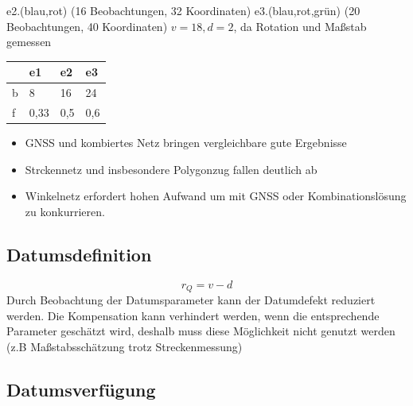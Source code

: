 \documentclass[12pt]{article}
\begin{document}
e2.(blau,rot) (16 Beobachtungen, 32 Koordinaten) \newline
e3.(blau,rot,grün) (20 Beobachtungen, 40 Koordinaten) \newline
$v=18, d=2$, da Rotation und Maßstab gemessen
\begin{table}[ht]\centering
	\begin{tabular}{|l|l|l|l|}
		\hline
	          &  e1     &   e2    & e3  \\ \hline
		b     & 8  & 16  & 24 \\ \hline
		f     & 0,33  & 0,5 & 0,6\\ \hline
	\end{tabular}
\end{table}
\begin{itemize}
\item GNSS und kombiertes Netz bringen vergleichbare gute Ergebnisse
\item Strckennetz und insbesondere Polygonzug fallen deutlich ab
\item Winkelnetz erfordert hohen Aufwand um mit GNSS oder Kombinationslösung zu konkurrieren.
\end{itemize}
\subsection{Datumsdefinition}
\begin{equation*}
r_Q = v - d
\end{equation*}
Durch Beobachtung der Datumsparameter kann der Datumdefekt reduziert werden. Die Kompensation kann verhindert werden, wenn die entsprechende Parameter geschätzt wird, deshalb muss diese Möglichkeit nicht genutzt werden (z.B Maßstabsschätzung trotz Streckenmessung)
\subsection{Datumsverfügung}
\end{document}
